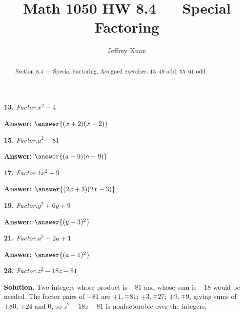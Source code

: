 \documentclass{ximera}
\author{Jeffrey Kuan}
\title{Math 1050 HW 8.4 --- Special Factoring}
\begin{document}
\begin{abstract}
    Section 8.4 --- Special Factoring.
    Assigned exercises: 13–49 odd, 55–61 odd.
\end{abstract}

\maketitle

\begin{problem}
\textbf{13.} \emph{Factor.}\quad $x^2 - 4$

\textbf{Answer:} $\answer{(x +2)(x -2)}$
\end{problem}

\begin{problem}
\textbf{15.} \emph{Factor.}\quad $a^2 - 81$

\textbf{Answer:} $\answer{(a +9)(a -9)}$
\end{problem}

\begin{problem}
\textbf{17.} \emph{Factor.}\quad $4x^2 - 9$

\textbf{Answer:} $\answer{(2x +3)(2x -3)}$
\end{problem}

\begin{problem}
\textbf{19.} \emph{Factor.}\quad $y^2 + 6y + 9$

\textbf{Answer:} $\answer{(y +3)^2}$
\end{problem}

\begin{problem}
\textbf{21.} \emph{Factor.}\quad $a^2 - 2a + 1$

\textbf{Answer:} $\answer{(a -1)^2}$
\end{problem}

\begin{problem}
\textbf{23.} \emph{Factor.}\quad $z^2 - 18z - 81$

\begin{multipleChoice}
\end{multipleChoice}

\begin{hint}
\textbf{Solution.} Two integers whose product is $-81$ and whose sum is $-18$ would be needed. The factor pairs of $-81$ are $\pm1,\mp81$; $\pm3,\mp27$; $\pm9,\mp9$, giving sums of $\pm80$, $\pm24$ and $0$, so $z^2-18z-81$ is nonfactorable over the integers.
\end{hint}
\end{problem}
\end{document}
